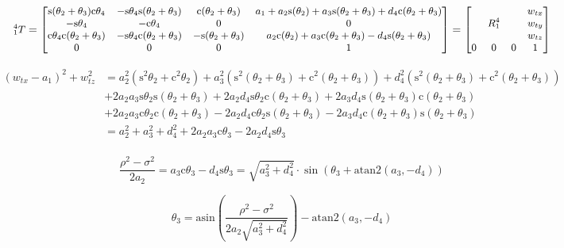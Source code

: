 \documentclass[twoside]{article}
\renewcommand{\c}{\text{c}}
\newcommand{\s}{\text{s}}
\newcommand{\T}[2]{\mbox{$_{#2}^{#1}{T}$}}
\begin{document}
$$ \small \T{4}{1} =
\begin{bmatrix}
  \s(\theta_2 + \theta_3)\c\theta_4 & -\s\theta_4\s(\theta_2 + \theta_3) & \c(\theta_2 + \theta_3) & a_1 + a_2\s(\theta_2) + a_3\s(\theta_2 + \theta_3) + d_4\c(\theta_2 + \theta_3) \\
  -\s\theta_4 & -\c\theta_4 & 0 & 0 \\
  \c\theta_4\c(\theta_2 + \theta_3) & -\s\theta_4\c(\theta_2 + \theta_3) & -\s(\theta_2 + \theta_3) & a_2\c(\theta_2) + a_3\c(\theta_2 + \theta_3) - d_4\s(\theta_2 + \theta_3) \\
  0 & 0 & 0 & 1\\
\end{bmatrix}
=
\begin{bmatrix}
& R_1^4& & \begin{matrix} w_{tx} \\ w_{ty} \\ w_{tz} \end{matrix} \\
0 & 0 & 0 & 1 \\
\end{bmatrix}
$$

\begin{equation}
\begin{split}
(w_{tx} - a_1)^2 + w_{tz}^2 &= a_2^2 (\s^2\theta_2 + \c^2\theta_2) + a_3^2 (\s^2(\theta_2 + \theta_3) + \c^2(\theta_2 + \theta_3)) + d_4^2(\s^2(\theta_2 + \theta_3) + \c^2(\theta_2 + \theta_3)) \\
                            &+ 2 a_2 a_3 \s\theta_2\s(\theta_2 + \theta_3) + 2 a_2 d_4 \s\theta_2\c(\theta_2 + \theta_3) + 2 a_3 d_4 \s(\theta_2+\theta_3)\c(\theta_2 + \theta_3) \\
                            &+ 2 a_2 a_3 \c\theta_2\c(\theta_2 + \theta_3) - 2 a_2 d_4 \c\theta_2\s(\theta_2 + \theta_3) - 2 a_3 d_4 \c(\theta_2+\theta_3)\s(\theta_2 + \theta_3) \\
                            &= a_2^2 + a_3^2 + d_4^2 + 2 a_2 a_3 \c\theta_3 - 2 a_2 d_4\s\theta_3 \\
\end{split}
\end{equation}

\begin{equation}
  \frac{\rho^2 - \sigma^2}{2 a_2} = a_3\c\theta_3 - d_4\s\theta_3 = \sqrt{a_3^2 + d_4^2} \cdot \sin(\theta_3 + \text{atan2}(a_3, -d_4))
\end{equation}

\begin{equation}
  \theta_3 = \text{asin}\left(\frac{\rho^2 - \sigma^2}{2 a_2 \sqrt{a_3^2 + d_4^2}}\right) - \text{atan2}(a_3, -d_4)
\end{equation}




%
%
\end{document}
